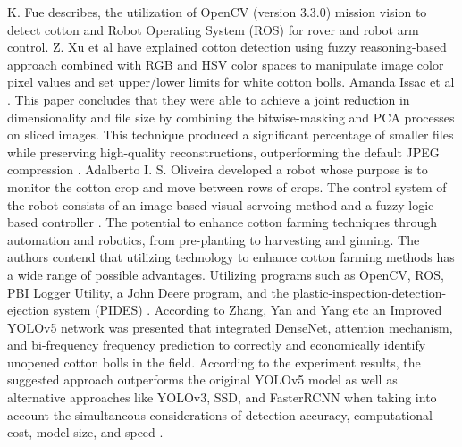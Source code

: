 \documentclass[12pt,a4paper]{report}
\begin{document}
\par K. Fue  describes, the utilization of OpenCV (version 3.3.0) mission vision to detect cotton and Robot Operating System (ROS) for rover and robot arm control. Z. Xu et al have explained cotton detection using fuzzy reasoning-based approach combined with RGB and HSV color spaces to manipulate image color pixel values and set upper/lower limits for white cotton bolls. Amanda Issac et al \cite{r6}. This paper concludes that they were able to achieve a joint reduction in dimensionality and file size by combining the bitwise-masking and PCA processes on sliced images. This technique produced a significant percentage of smaller files while preserving high-quality reconstructions, outperforming the default JPEG compression \cite{r7}. Adalberto I. S. Oliveira developed a robot whose purpose is to monitor the cotton crop and move between rows of crops. The control system of the robot consists of an image-based visual servoing method and a fuzzy logic-based controller \cite{r8}. The potential to enhance cotton farming techniques through automation and robotics, from pre-planting to harvesting and ginning. The authors contend that utilizing technology to enhance cotton farming methods has a wide range of possible advantages. Utilizing programs such as OpenCV, ROS, PBI Logger Utility, a John Deere program, and the plastic-inspection-detection-ejection system (PIDES) \cite{r9}. According to Zhang, Yan and Yang etc an Improved YOLOv5 network was presented that integrated DenseNet, attention mechanism, and bi-frequency frequency prediction to correctly and economically identify unopened cotton bolls in the field. According to the experiment results, the suggested approach outperforms the original YOLOv5 model as well as alternative approaches like YOLOv3, SSD, and FasterRCNN when taking into account the simultaneous considerations of detection accuracy, computational cost, model size, and speed \cite{r10}.
\end{document}
